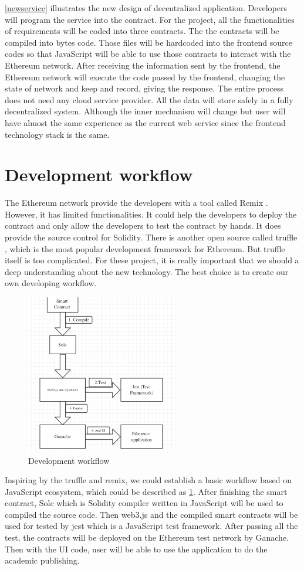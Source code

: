 \documentclass{ecsthesis}      %
\begin{document}
\ref{newservice} illustrates the new design of decentralized application. Developers will program the service into the contract. 
For the project, all the functionalities of requirements will be coded into three contracts. The the contracts will be compiled into bytes code. 
Those files will be hardcoded into the frontend source codes so that JavaScript will be able to use those contracts to interact with the Ethereum network.
After receiving the information sent by the frontend, the Ethereum network will execute the code passed by the frontend, 
changing the state of network and keep and record, 
giving the response. The entire process does not need any cloud service provider. 
All the data will store safely in a fully decentralized system. 
Although the inner mechanism will change 
but user will have almost the same experience as the current web service 
since the frontend technology stack is the same.
\section{Development workflow}
The Ethereum network provide the developers with a tool called Remix \cite{remix}. 
However, it has limited functionalities. 
It could help the developers to deploy the contract and only allow the developers to test the contract by hands.
It does provide the source control for Solidity. There is another open source called truffle \cite{truffle}, 
which is the most popular development framework for Ethereum. But truffle itself is too complicated. For these project, 
it is really important that we should a deep understanding about the new technology. The best choice is to create our own developing workflow.
\begin{figure}[H]
  \centering
  \includegraphics[width=0.6\textwidth]{developWorkFlow.png}
  \caption{Development workflow}
  \label{develop} 
\end{figure}
Inspiring by the truffle and remix, we could establish a basic workflow based on JavaScript ecosystem, which could be described as \ref{develop}.
After finishing the smart contract, Solc \cite{solc} which is Solidity compiler written in JavaScript will be used to compiled the source code.
Then web3.js and the compiled smart contracts will be used for tested by jest which is a JavaScript test framework. 
After passing all the test, the contracts will be deployed on the Ethereum test network by Ganache.
Then with the UI code, user will be able to use the application to do the academic publishing.
\end{document}
